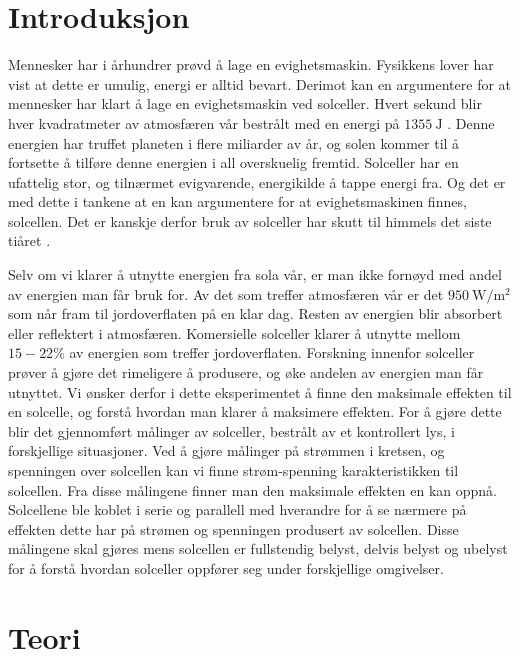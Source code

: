 \documentclass[%
 reprint,
 amsmath,amssymb,
 aps,
 norsk,
 booktabs
]{revtex4-1}
\begin{document}
\section{Introduksjon}
Mennesker har i århundrer prøvd å lage en evighetsmaskin. Fysikkens lover har vist at dette er umulig, energi er alltid bevart. Derimot kan en argumentere for at mennesker har klart å lage en evighetsmaskin ved solceller. Hvert sekund blir hver kvadratmeter av atmosfæren vår bestrålt med en energi på $\SI{1355}{\joule}$ \cite{oppgave}. Denne energien har truffet planeten i flere miliarder av år, og solen kommer til å fortsette å tilføre denne energien i all overskuelig fremtid. Solceller har en ufattelig stor, og tilnærmet evigvarende, energikilde å tappe energi fra. Og det er med dette i tankene at en kan argumentere for at evighetsmaskinen finnes, solcellen. Det er kanskje derfor bruk av solceller har skutt til himmels det siste tiåret \cite{oppgave}.\par
Selv om vi klarer å utnytte energien fra sola vår, er man ikke fornøyd med andel av energien man får bruk for. Av det som treffer atmosfæren vår er det $\SI{950}{\watt\per\meter^2}$ som når fram til jordoverflaten på en klar dag. Resten av energien blir absorbert eller reflektert i atmosfæren. Komersielle solceller klarer å utnytte mellom $15-22\%$ av energien som treffer jordoverflaten. Forskning innenfor solceller prøver å gjøre det rimeligere å produsere, og øke andelen av energien man får utnyttet. Vi ønsker derfor i dette eksperimentet å finne den maksimale effekten til en solcelle, og forstå hvordan man klarer å maksimere effekten. For å gjøre dette blir det gjennomført målinger av solceller, bestrålt av et kontrollert lys, i forskjellige situasjoner. Ved å gjøre målinger på strømmen i kretsen, og spenningen over solcellen kan vi finne strøm-spenning karakteristikken til solcellen. Fra disse målingene finner man den maksimale effekten en kan oppnå. Solcellene ble koblet i serie og parallell med hverandre for å se nærmere på effekten dette har på strømen og spenningen produsert av solcellen. Disse målingene skal gjøres mens solcellen er fullstendig belyst, delvis belyst og ubelyst for å forstå hvordan solceller oppfører seg under forskjellige omgivelser.
\section{Teori}
\end{document}
